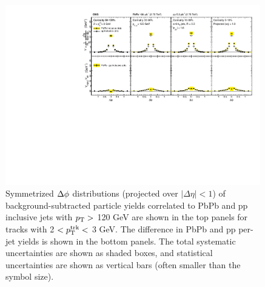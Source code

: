 \begin{figure}[hbt] 
\begin{center} 
\includegraphics[width=0.99\textwidth]{figures/Results/PAS_Figure_4_TrkPt2_TrkPt3.pdf}
\caption[Inclusive jet $\Delta\phi$ correlations for tracks with $2 < p_{\rm T}^{\rm trk} < 3$ GeV at 2.76 TeV]{Symmetrized $\protect\Delta\phi$ distributions  (projected over $|\Delta\eta| < 1$) of background-subtracted particle yields correlated to PbPb and pp inclusive jets with $p_{\rm T} >$ 120 GeV are shown in the top panels for tracks with 2 $ < p_{\rm T}^{\rm trk} < $ 3 GeV.  The difference in PbPb and pp per-jet yields is shown in the bottom panels. The total systematic uncertainties are shown as shaded boxes, and statistical uncertainties are shown as vertical bars (often smaller than the symbol size).}
\label{fig:Inclusive_dPhi2} 
\end{center} 
\end{figure} 



